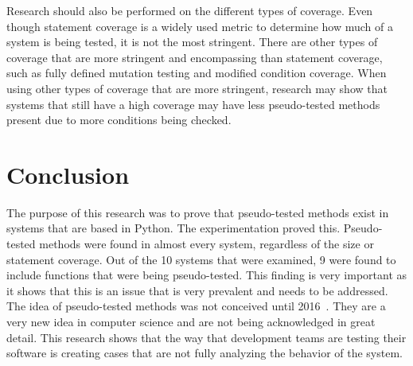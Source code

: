 Research should also be performed on the different types of coverage. Even though statement coverage is a widely used metric to determine how much of a system is being tested, it is not the most stringent. There are other types of coverage that are more stringent and encompassing than statement coverage, such as fully defined mutation testing and modified condition coverage. When using other types of coverage that are more stringent, research may show that systems that still have a high coverage may have less pseudo-tested methods present due to more conditions being checked.


\section{Conclusion}
The purpose of this research was to prove that pseudo-tested methods exist in systems that are based in Python. The experimentation proved this. Pseudo-tested methods were found in almost every system, regardless of the size or statement coverage. Out of the 10 systems that were examined, 9 were found to include functions that were being pseudo-tested. This finding is very important as it shows that this is an issue that is very prevalent and needs to be addressed. The idea of pseudo-tested methods was not conceived until 2016~\cite{niedermayr2016will}. They are a very new idea in computer science and are not being acknowledged in great detail. This research shows that the way that development teams are testing their software is creating cases that are not fully analyzing the behavior of the system.

